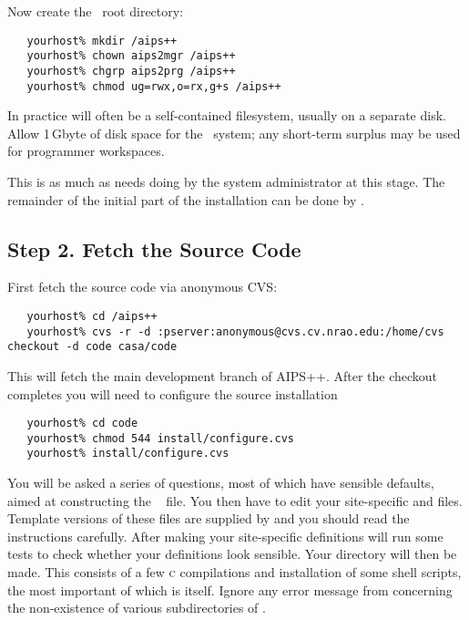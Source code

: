 Now create the \aipspp\ root directory:

\begin{verbatim}
   yourhost% mkdir /aips++
   yourhost% chown aips2mgr /aips++
   yourhost% chgrp aips2prg /aips++
   yourhost% chmod ug=rwx,o=rx,g+s /aips++
\end{verbatim}

\noindent
In practice  will often be a self-contained filesystem, usually
on a separate disk.  Allow 1\,Gbyte of disk space for the \aipspp\ system; any
short-term surplus may be used for programmer workspaces.

This is as much as needs doing by the system administrator at this stage.  The
remainder of the initial part of the installation can be done by
.

\subsection*{Step 2. Fetch the Source Code}

First fetch the source code via anonymous CVS:

\begin{verbatim}
   yourhost% cd /aips++
   yourhost% cvs -r -d :pserver:anonymous@cvs.cv.nrao.edu:/home/cvs checkout -d code casa/code
\end{verbatim}

\noindent
This will fetch the main development branch of AIPS++. After the checkout completes you will
need to configure the source installation

\begin{verbatim}
   yourhost% cd code
   yourhost% chmod 544 install/configure.cvs
   yourhost% install/configure.cvs
\end{verbatim}

\noindent
You will be asked a series of questions, most of which have sensible defaults,
aimed at constructing the \aipspp\  file.  You then have to
edit your site-specific  and  files.  Template
versions of these files are supplied by  and you should read
the instructions carefully.  After making your site-specific definitions
 will run some tests to check whether your 
definitions look sensible.  Your  directory will then be made.
This consists of a few \textsc{c} compilations and installation of some shell
scripts, the most important of which is  itself.  Ignore any
error message from  concerning the non-existence of various
subdirectories of .

